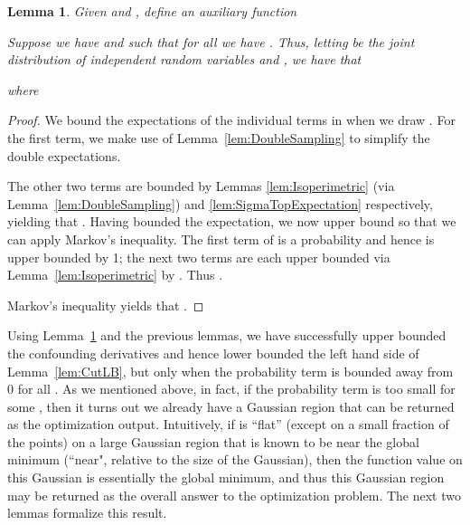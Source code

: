 \documentclass[11pt,letter]{article}
\newcounter{nTheorems}
\numberwithin{nTheorems}{section}
\newtheorem{lemma}[nTheorems]{Lemma}
\begin{document}
\begin{lemma}
\label{lem:MarkovGadget}
Given  and , define an auxiliary function

Suppose we have  and  such that for all  we have .
Thus, letting  be the joint distribution of independent random variables  and , we have that

where

\end{lemma}

\begin{proof}
We bound the expectations of the individual terms in  when we draw .
For the first term, we make use of Lemma~\ref{lem:DoubleSampling} to simplify the double expectations.

The other two terms are bounded by Lemmas \ref{lem:Isoperimetric} (via Lemma~\ref{lem:DoubleSampling}) and \ref{lem:SigmaTopExpectation} respectively, yielding that . Having bounded the expectation, we now upper bound  so that we can apply Markov's inequality. The first term of  is a probability and hence is upper bounded by 1; the next two terms are each upper bounded via Lemma~\ref{lem:Isoperimetric} by . Thus .

Markov's inequality yields that .
\end{proof}

Using Lemma~\ref{lem:MarkovGadget} and the previous lemmas, we have successfully upper bounded the confounding derivatives and hence lower bounded the left hand side of Lemma~\ref{lem:CutLB}, but only when the probability term is bounded away from 0 for all .
As we mentioned above, in fact, if the probability term is too small for some , then it turns out we already have a Gaussian region that can be returned as the optimization output.
Intuitively, if  is ``flat'' (except on a small fraction of the points) on a large Gaussian region that is known to be near the global minimum (``near", relative to the size of the Gaussian), then the function value on this Gaussian is essentially the global minimum, and thus this Gaussian region may be returned as the overall answer to the optimization problem.
The next two lemmas formalize this result.
\end{document}
